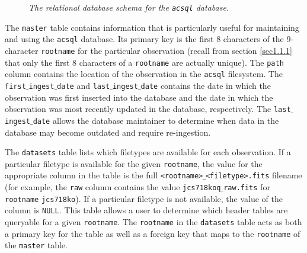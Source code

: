 \documentclass[10pt,journal,compsoc]{IEEEtran}
\begin{document}
\begin{figure}[!t]
\centering
{}
\caption{\textit{The relational database schema for the \texttt{acsql} database.}
\label{fig11}}
\end{figure}

The \texttt{master} table contains information that is particularly useful for maintaining and using the \texttt{acsql} database.  Its primary key is the first 8 characters of the
9-character \texttt{rootname} for the particular observation (recall from section \ref{sec1.1.1} that only the first 8 characters of a \texttt{rootname} are actually unique).
The \texttt{path} column contains the location of the observation in the \texttt{acsql} filesystem.  The \texttt{first$\_$ingest$\_$date} and \texttt{last$\_$ingest$\_$date} contains
the date in which the observation was first inserted into the database and the date in which the observation was most recently updated in the database, respectively. The
\texttt{last$\_$ingest$\_$date} allows the database maintainer to determine when data in the database may become outdated and require re-ingestion.

The \texttt{datasets} table lists which filetypes are available for each observation.  If a particular filetype is available for the given \texttt{rootname}, the value for the
appropriate column in the table is the full \texttt{<rootname>$\_$<filetype>.fits} filename (for example, the \texttt{raw} column contains the value \texttt{jcs718koq$\_$raw.fits} for
\texttt{rootname} \texttt{jcs718ko}). If a particular filetype is not available, the value of the column is \texttt{NULL}. This table allows a user to determine which header tables are
queryable for a given \texttt{rootname}.  The \texttt{rootname} in the \texttt{datasets} table acts as both a primary key for the table as well as a foreign key that maps to the
\texttt{rootname} of the \texttt{master} table.
\end{document}
